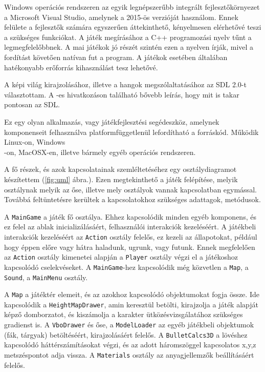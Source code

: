 \label{Chap:komponensek}


Windows operációs rendszeren az egyik legnépszerűbb integrált fejlesztőkörnyezet a Microsoft Visual Studio, amelynek a 2015-ös verzióját használom. Ennek felülete a fejlesztők számára egyszerűen áttekinthető, kényelmesen elérhetővé teszi a szükséges funkciókat. A játék megírásához a C++ programozási nyelv tűnt a legmegfelelőbbnek. A mai játékok jó részét szintén ezen a nyelven írják, mivel a fordítást követően natívan fut a program. A játékok esetében általában hatékonyabb erőforrás kihasználást tesz lehetővé.

A képi világ kirajzolásához, illetve a hangok megszólaltatásához az SDL 2.0-t választottam. A \cite{SDL}-es hivatkozáson található bővebb leírás, hogy mit is takar pontosan az SDL.

Ez egy olyan alkalmazás, vagy játékfejlesztési segédeszköz, amelynek komponenseit felhasználva platformfüggetlenül lefordítható a forráskód. Működik Linux-on, Windows\\-on, MacOSX-en, illetve bármely egyéb operációs rendszeren.


A fő részek, és azok kapcsolatainak szemléltetéséhez egy osztálydiagramot készítettem (\ref{fig:uml} ábra.). Ezen megtekinthető a játék felépítése, melyik osztálynak melyik az őse, illetve mely osztályok vannak kapcsolatban egymással. Továbbá feltüntetésre kerültek a kapcsolatokhoz szükséges adattagok, metódusok.

A \texttt{MainGame} a játék fő osztálya. Ehhez kapcsolódik minden egyéb komponens, és ez felel az ablak inicializálásáért, felhasználói interakciók kezeléséért. A játékbeli interakciók kezeléséért az \texttt{Action} osztály felelős, ez kezeli az állapotokat, például hogy éppen előre vagy hátra haladunk, ugrunk, vagy futunk. Ennek megfelelően az \texttt{Action} osztály kimenetei alapján a \texttt{Player} osztály végzi el a játékoshoz kapcsolódó cselekvéseket. A \texttt{MainGame}-hez kapcsolódik még közvetlen a \texttt{Map}, a \texttt{Sound}, a \texttt{MainMenu} osztály. 

A \texttt{Map} a játéktér elemeit, és az azokhoz kapcsolódó objektumokat fogja össze. Ide kapcsolódik a \texttt{HeightMapDrawer}, amin keresztül betölti, kirajzolja a játék alapját képző domborzatot, és kiszámolja a karakter ütközésvizsgálatához szükséges gradienst is. A \texttt{VboDrawer} és őse, a \texttt{ModelLoader} az egyéb játékbeli objektumok (fák, tárgyak) betöltéséért, kirajzolásáért felelős. A \texttt{BulletCalcs3D} a lövéshez kapcsolódó háttérszámításokat végzi, és az adott háromszöggel kapcsolatos x,y,z metszéspontot adja vissza. A \texttt{Materials} osztály az anyagjellemzők beállításáért felelős.


